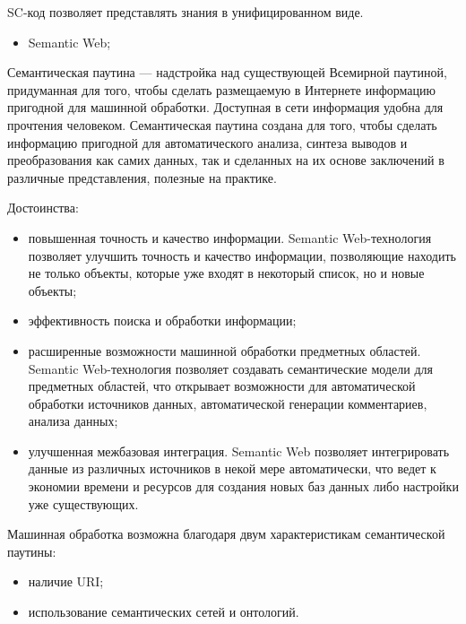 SC-код позволяет представлять знания в унифицированном виде.

\begin{itemize}
	\item Semantic Web;
\end{itemize}
Семантическая паутина — надстройка над существующей Всемирной паутиной, придуманная для того, чтобы сделать размещаемую в Интернете информацию пригодной для машинной обработки. Доступная в сети информация удобна для прочтения человеком. Семантическая паутина создана для того, чтобы сделать информацию пригодной для автоматического анализа, синтеза выводов и преобразования как самих данных, так и сделанных на их основе заключений в различные представления, полезные на практике. 

Достоинства:
\begin{itemize}
	\item повышенная точность и качество информации. Semantic Web-технология позволяет улучшить точность и качество информации, позволяющие находить не только объекты, которые уже входят в некоторый список, но и новые объекты;
	\item эффективность поиска и обработки информации;
	\item расширенные возможности машинной обработки предметных областей. Semantic Web-технология позволяет создавать семантические модели для предметных областей, что открывает возможности для автоматической обработки источников данных, автоматической генерации комментариев, анализа данных;
	\item улучшенная межбазовая интеграция. Semantic Web позволяет интегрировать данные из различных источников в некой мере автоматически, что ведет к экономии времени и ресурсов для создания новых баз данных либо настройки уже существующих.
\end{itemize}

Машинная обработка возможна благодаря двум характеристикам семантической паутины:
\begin{itemize}
	\item наличие URI;
	\item использование семантических сетей и онтологий. 
\end{itemize}

